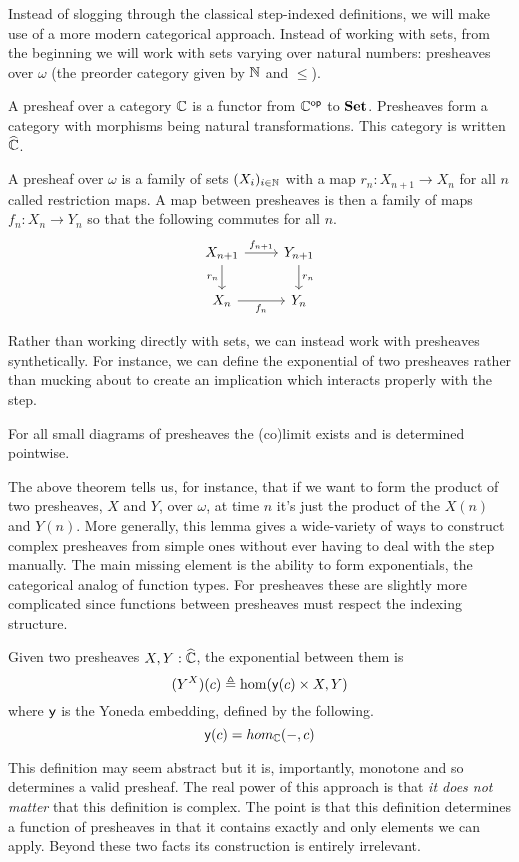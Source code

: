 Instead of slogging through the classical step-indexed definitions, we
will make use of a more modern categorical approach. Instead of
working with sets, from the beginning we will work with sets varying
over natural numbers: presheaves over $\omega$ (the preorder category
given by $\mathbb{N}$ and $\le$).
\begin{defn}
  A presheaf over a category $\mathbb{C}$ is a functor from $\mathbb{C}^{\mathsf{op}}$ to
  $\mathbf{Set}$. Presheaves form a category with morphisms being natural
  transformations. This category is written $\widehat{\mathbb{C}}$.
\end{defn}
\begin{example}
  A presheaf over $\omega$ is a family of sets $(X_i)_{i \in \mathbb{N}}$
  with a map $r_n : X_{n + 1} \to X_n$ for all $n$ called restriction
  maps. A map between presheaves is then a family of maps
  $f_n : X_n \to Y_n$ so that the following commutes for all $n$.
  \[
    \begin{tikzcd}
      X_{n + 1} \ar[r, "f_{n + 1}"] \ar[d, swap, "r_n"] & Y_{n + 1} \ar[d, "r_n"]\\
      X_n \ar[r, swap, "f_n"] & Y_n
    \end{tikzcd}
  \]
\end{example}
Rather than working directly with sets, we can instead work with
presheaves synthetically. For instance, we can define the exponential
of two presheaves rather than mucking about to create an implication
which interacts properly with the step.
\begin{lem}
  For all small diagrams of presheaves the (co)limit exists and is
  determined pointwise.
\end{lem}
The above theorem tells us, for instance, that if we want to form the
product of two presheaves, $X$ and $Y$, over $\omega$, at time $n$ it's just the
product of the $X(n)$ and $Y(n)$. More generally, this lemma gives a
wide-variety of ways to construct complex presheaves from simple ones
without ever having to deal with the step manually. The main missing
element is the ability to form exponentials, the categorical analog of
function types. For presheaves these are slightly more complicated since
functions between presheaves must respect the indexing structure.
\begin{lem}
  Given two presheaves $X, Y : \widehat{\mathbb{C}}$, the exponential
  between them is
  \[
    (Y^X)(c) \triangleq \hom(\mathsf{y}(c) \times X, Y)
  \]
  where $\mathsf{y}$ is the Yoneda embedding, defined by the following.
  \[
    \mathsf{y}(c) = hom_{\mathbb{C}}(-, c)
  \]
\end{lem}
This definition may seem abstract but it is, importantly, monotone and
so determines a valid presheaf. The real power of this approach is
that \emph{it does not matter} that this definition is complex. The
point is that this definition determines a function of presheaves in
that it contains exactly and only elements we can apply. Beyond these
two facts its construction is entirely irrelevant. %

